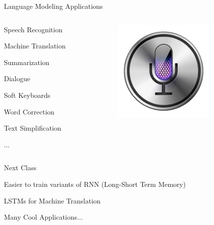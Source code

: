 \documentclass{beamer}
\let\tempone\itemize
\let\temptwo\enditemize
\renewenvironment{itemize}{\tempone\addtolength{\itemsep}{0.5\baselineskip}}{\temptwo}
\begin{document}
\begin{frame}{Language Modeling Applications}

  \begin{columns}    
    \begin{column}{0.5\textwidth}
  \begin{itemize}
  \item Speech Recognition
  \item Machine Translation
  \item Summarization
  \item Dialogue
  \item Soft Keyboards
  \item Word Correction
  \item Text Simplification
  \item $\ldots$
  \end{itemize}
  \end{column}


    \begin{column}{0.5\textwidth}
      \vspace{2cm}
     
      \includegraphics[width=5cm]{siri}
    \end{column}
  \end{columns}

\end{frame}

\begin{frame}{Next Class}
  
  \begin{itemize}
  \item Easier to train variants of RNN (Long-Short Term Memory)
  \item LSTMs for Machine Translation 
  \item Many Cool Applications...
  \end{itemize}

\end{frame}
\end{document}
